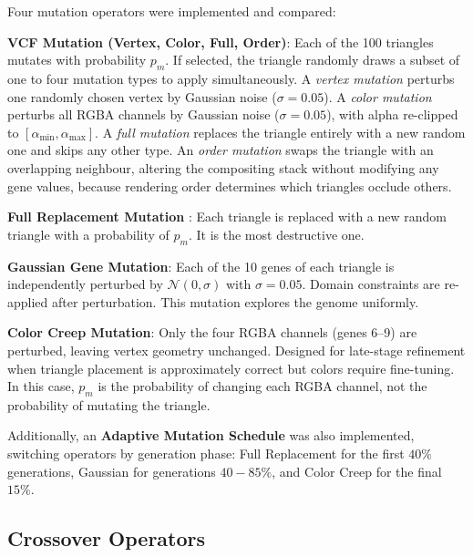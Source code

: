 \documentclass[11pt,a4paper]{article}
\begin{document}
Four mutation operators were implemented and compared:

\vspace{0.2cm}

\textbf{VCF Mutation (Vertex, Color, Full, Order)}: Each of the 100 triangles mutates with probability $p_m$. If selected, the triangle randomly draws a subset of one to four mutation types to apply simultaneously. A \textit{vertex mutation} perturbs one randomly chosen vertex by Gaussian noise ($\sigma=0.05$). A \textit{color mutation} perturbs all RGBA channels by Gaussian noise ($\sigma=0.05$), with alpha re-clipped to $[\alpha_{\min}, \alpha_{\max}]$. A \textit{full mutation} replaces the triangle entirely with a new random one and skips any other type. An \textit{order mutation} swaps the triangle with an overlapping neighbour, altering the compositing stack without modifying any gene values, because rendering order determines which triangles occlude others.
\vspace{0.2cm}


\textbf{Full Replacement Mutation} : Each triangle is replaced with a new random triangle with a probability of $p_{m}$. It is the most destructive one.

\vspace{0.2cm}

\textbf{Gaussian Gene Mutation}: Each of the 10 genes of each triangle is independently perturbed by $\mathcal{N}(0, \sigma)$ with $\sigma=0.05$. Domain constraints are re-applied after perturbation. This mutation explores the genome uniformly.

\textbf{Color Creep Mutation}: Only the four RGBA channels (genes 6--9) are perturbed, leaving vertex geometry unchanged. Designed for late-stage refinement when triangle placement is approximately correct but colors require fine-tuning. In this case, $p_{m}$ is the probability of changing each RGBA channel, not the probability of mutating the triangle.

\vspace{0.2cm}

Additionally, an \textbf{Adaptive Mutation Schedule} was also implemented, switching operators by generation phase: Full Replacement for the first $40\%$ generations, Gaussian for generations $40-85\%$, and Color Creep for the final $15\%$.



\subsection{Crossover Operators}
\end{document}
